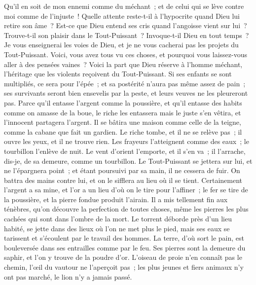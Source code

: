 \begin{multicols}{2}
Qu'il en soit de mon ennemi comme du méchant~; et de celui qui se lève contre moi comme de l'injuste~!
Quelle attente reste-t-il à l'hypocrite quand Dieu lui retire son âme~?
Est-ce que Dieu entend ses cris quand l'angoisse vient sur lui~?
Trouve-t-il son plaisir dans le Tout-Puissant~? Invoque-t-il Dieu en tout temps~?
Je vous enseignerai les voies de Dieu, et je ne vous cacherai pas les projets du Tout-Puissant.
Voici, vous avez tous vu ces choses, et pourquoi vous laissez-vous aller à des pensées vaines~?
Voici la part que Dieu réserve à l'homme méchant, l'héritage que les violents reçoivent du Tout-Puissant.
Si ses enfants se sont multipliés, ce sera pour l'épée~; et sa postérité n'aura pas même assez de pain~;
ses survivants seront bien ensevelis par la peste, et leurs veuves ne les pleureront pas.
Parce qu'il entasse l'argent comme la poussière, et qu'il entasse des habits comme on amasse de la boue,
le riche les entassera mais le juste s'en vêtira, et l'innocent partagera l'argent.
Il se bâtira une maison comme celle de la teigne, comme la cabane que fait un gardien.
Le riche tombe, et il ne se relève pas~; il ouvre les yeux, et il ne trouve rien.
Les frayeurs l'atteignent comme des eaux~; le tourbillon l'enlève de nuit.
Le vent d'orient l'emporte, et il s'en va~; il l'arrache, dis-je, de sa demeure, comme un tourbillon.
 Le Tout-Puissant se jettera sur lui, et ne l'épargnera point~; et étant poursuivi par sa main, il ne cessera de fuir.
On battra des mains contre lui, et on le sifflera au lieu où il se tient.
\VerseOne{}Certainement l'argent a sa mine, et l'or a un lieu d'où on le tire pour l'affiner~;
le fer se tire de la poussière, et la pierre fondue produit l'airain.
Il a mis tellement fin aux ténèbres, qu'on découvre la perfection de toutes choses, même les pierres les plus cachées qui sont dans l'ombre de la mort.
Le torrent déborde près d'un lieu habité, se jette dans des lieux où l'on ne met plus le pied, mais ses eaux se tarissent et s'écoulent par le travail des hommes.
La terre, d'où sort le pain, est bouleversée dans ses entrailles comme par le feu.
Ses pierres sont la demeure du saphir, et l'on y trouve de la poudre d'or.
L'oiseau de proie n'en connaît pas le chemin, l'œil du vautour ne l'aperçoit pas~;
les plus jeunes et fiers animaux n'y ont pas marché, le lion n'y a jamais passé.

\end{multicols}

